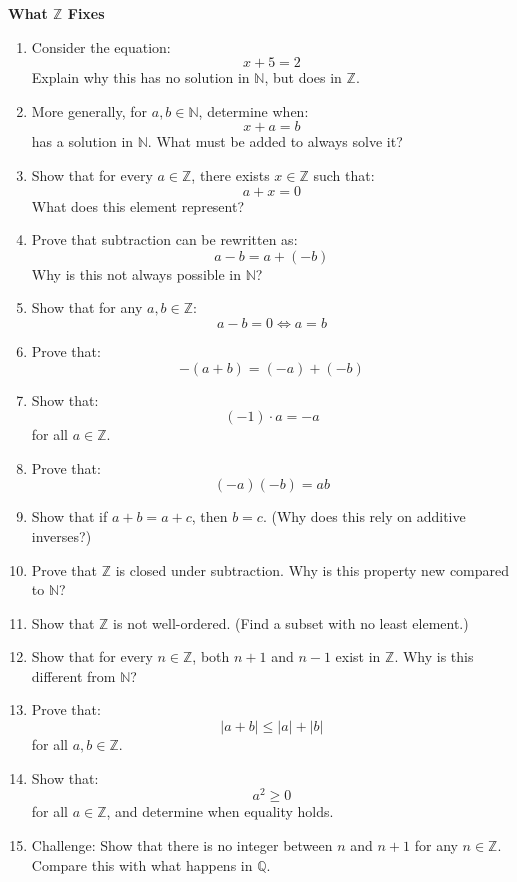 \documentclass[11pt]{article}
\newcommand{\N}{\mathbb{N}}
\newcommand{\Z}{\mathbb{Z}}
\newcommand{\Q}{\mathbb{Q}}
\begin{document}
\begin{problembox}

\textbf{What $\Z$ Fixes}

\begin{enumerate}

\item Consider the equation:
\[
x + 5 = 2
\]
Explain why this has no solution in $\N$, but does in $\Z$.

\item More generally, for $a,b \in \N$, determine when:
\[
x + a = b
\]
has a solution in $\N$.  
What must be added to always solve it?

\item Show that for every $a \in \Z$, there exists $x \in \Z$ such that:
\[
a + x = 0
\]
What does this element represent?

\item Prove that subtraction can be rewritten as:
\[
a - b = a + (-b)
\]
Why is this not always possible in $\N$?

\item Show that for any $a,b \in \Z$:
\[
a - b = 0 \iff a = b
\]

\item Prove that:
\[
-(a + b) = (-a) + (-b)
\]

\item Show that:
\[
(-1)\cdot a = -a
\]
for all $a \in \Z$.

\item Prove that:
\[
(-a)(-b) = ab
\]

\item Show that if $a + b = a + c$, then $b = c$.  
(Why does this rely on additive inverses?)

\item Prove that $\Z$ is closed under subtraction.  
Why is this property new compared to $\N$?

\item Show that $\Z$ is not well-ordered.  
(Find a subset with no least element.)

\item Show that for every $n \in \Z$, both $n+1$ and $n-1$ exist in $\Z$.  
Why is this different from $\N$?

\item Prove that:
\[
|a+b| \le |a| + |b|
\]
for all $a,b \in \Z$.

\item Show that:
\[
a^2 \ge 0
\]
for all $a \in \Z$, and determine when equality holds.

\item Challenge:  
Show that there is no integer between $n$ and $n+1$ for any $n \in \Z$.  
Compare this with what happens in $\Q$.

\end{enumerate}

\end{problembox}
\end{document}
